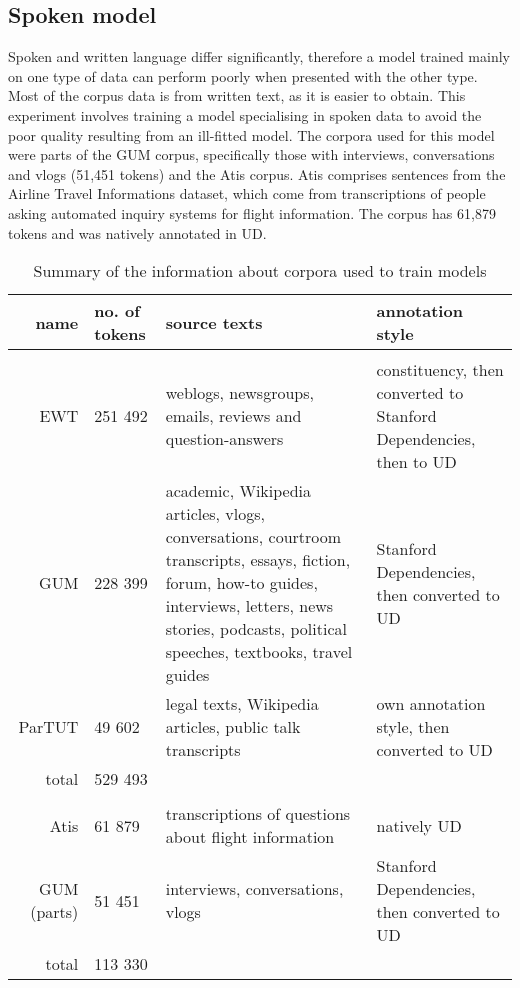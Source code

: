 
\subsection{Spoken model}
Spoken and written language differ significantly, therefore a model trained mainly on one type of data can perform poorly when presented with the other type. Most of the corpus data is from written text, as it is easier to obtain. This experiment involves training a model specialising in spoken data to avoid the poor quality resulting from an ill-fitted model. The corpora used for this model were parts of the GUM corpus, specifically those with interviews, conversations and vlogs (51,451 tokens) and the Atis corpus. Atis comprises sentences from the Airline Travel Informations dataset, which come from transcriptions of people asking automated inquiry systems for flight information. The corpus has 61,879 tokens and was natively annotated in UD. 

\begin{table}[hbt!]
\begin{adjustwidth}{-20pt}{20pt}
	\begin{tabular}{r || p{2.5cm} | p{5cm} | p{3.5cm}}
		name & no. of tokens & source texts & annotation style\\
		\hline\hline
		\rowcolor{lightgray} \multicolumn{4}{c}{combined model}\\
		\hline\hline
		EWT & 251 492 & weblogs, newsgroups, emails, reviews and question-answers & constituency, then converted to Stanford Dependencies, then to UD\\\hline
		GUM & 228 399 & academic, Wikipedia articles, vlogs, conversations, courtroom transcripts, essays, fiction, forum, how-to guides, interviews, letters, news stories, podcasts, political speeches, textbooks, travel guides & Stanford Dependencies, then converted to UD\\\hline
		ParTUT & 49 602 & legal texts, Wikipedia articles, public talk transcripts & own annotation style, then converted to UD\\\hline
		total & \multicolumn{3}{l}{529 493}\\
		\hline\hline
		\rowcolor{lightgray} \multicolumn{4}{c}{spoken model}\\
		\hline\hline
		Atis & 61 879 & transcriptions of questions about flight information & natively UD\\\hline
		GUM (parts) & 51 451 & interviews, conversations, vlogs & Stanford Dependencies, then converted to UD\\\hline
		total & \multicolumn{3}{l}{113 330}
	\end{tabular}
\end{adjustwidth}
\caption{Summary of the information about corpora used to train models}\label{tab:corpora}
\end{table}

